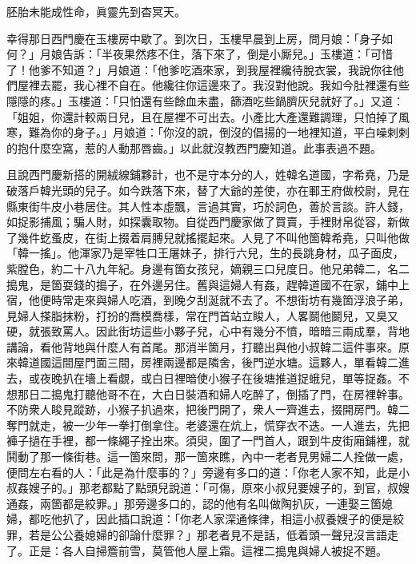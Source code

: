 \begin{myquote} 
胚胎未能成性命，眞靈先到杳冥天。
\end{myquote} 

幸得那日西門慶在玉樓房中歇了。到次日，玉樓早晨到上房，問月娘：「身子如何？」月娘告訴：「半夜果然疼不住，落下來了，倒是小厮兒。」玉樓道：「可惜了！他爹不知道？」月娘道：「他爹吃酒來家，到我屋裡纔待脫衣裳，我說你往他們屋裡去罷，我心裡不自在。他纔往你這邊來了。我沒對他說。我如今肚裡還有些隱隱的疼。」玉樓道：「只怕還有些餘血未盡，篩酒吃些鍋臍灰兒就好了。」又道：「姐姐，你還計較兩日兒，且在屋裡不可出去。小產比大產還難調理，只怕掉了風寒，難為你的身子。」月娘道：「你沒的說，倒沒的倡揚的一地裡知道，平白噪剌剌的抱什麼空窩，惹的人動那唇齒。」{}以此就沒教西門慶知道。此事表過不題。

且說西門慶新搭的開絨線鋪夥計，也不是守本分的人，姓韓名道國，字希堯，乃是破落戶韓光頭的兒子。如今跌落下來，替了大爺的差使，亦在鄆王府做校尉，見在縣東街牛皮小巷居住。其人性本虛飄，言過其實，巧於詞色，善於言談。許人錢，如捉影捕風；騙人財，如探囊取物。自從西門慶家做了買賣，手裡財帛從容，新做了幾件虼蚤皮，在街上掇着肩膊兒就搖擺起來。人見了不叫他箇韓希堯，只叫他做「韓一搖」。他渾家乃是宰牲口王屠妹子，排行六兒，生的長跳身材，瓜子面皮，紫膛色，約二十八九年紀。身邊有箇女孩兒，嫡親三口兒度日。他兄弟韓二，名二搗鬼，是箇耍錢的搗子，在外邊另住。舊與這婦人有姦，趕韓道國不在家，鋪中上宿，他便時常走來與婦人吃酒，到晚夕刮涎就不去了。不想街坊有幾箇浮浪子弟，見婦人搽脂抹粉，打扮的喬模喬樣，常在門首站立睃人，人畧鬬他鬬兒，又臭又硬，就張致罵人。因此街坊這些小夥子兒，心中有幾分不憤，暗暗三兩成羣，背地講論，看他背地與什麼人有首尾。那消半箇月，打聽出與他小叔韓二這件事來。原來韓道國這間屋門面三間，房裡兩邊都是隣舍，後門逆水塘。這夥人，單看韓二進去，或夜晚扒在墻上看覷，或白日裡暗使小猴子在後塘推道捉蛾兒，單等捉姦。不想那日二搗鬼打聽他哥不在，大白日裝酒和婦人吃醉了，倒插了門，在房裡幹事。不防衆人睃見蹤跡，小猴子扒過來，把後門開了，衆人一齊進去，掇開房門。韓二奪門就走，被一少年一拳打倒拿住。老婆還在炕上，慌穿衣不迭。一人進去，先把褲子撾在手裡，都一條繩子拴出來。{}須臾，圍了一門首人，跟到牛皮街廂鋪裡，就鬨動了那一條街巷。這一箇來問，那一箇來瞧，內中一老者見男婦二人拴做一處，便問左右看的人：「此是為什麼事的？」旁邊有多口的道：「你老人家不知，此是小叔姦嫂子的。」那老都點了點頭兒說道：「可傷，原來小叔兒要嫂子的，到官，叔嫂通姦，兩箇都是絞罪。」那旁邊多口的，認的他有名叫做陶扒灰，一連娶三箇媳婦，都吃他扒了，因此插口說道：「你老人家深通條律，相這小叔養嫂子的便是絞罪，若是公公養媳婦的卻論什麼罪？」那老者見不是話，低着頭一聲兒沒言語走了。{}正是：各人自掃簷前雪，莫管他人屋上霜。這裡二搗鬼與婦人被捉不題。

